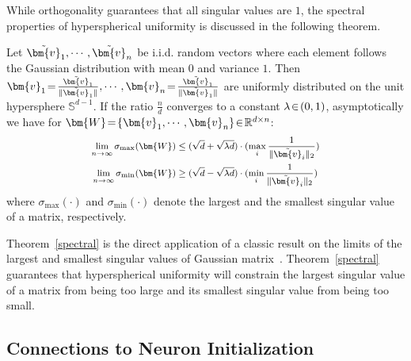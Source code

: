 While orthogonality guarantees that all singular values are $1$, the spectral properties of hyperspherical uniformity is discussed in the following theorem.

\begin{theorem}\label{spectral}
Let $\thickmuskip=2mu \medmuskip=2mu \tilde{\bm{v}}_1,\cdots,\tilde{\bm{v}}_n$ be i.i.d. random vectors where each element follows the Gaussian distribution with mean $0$ and variance $1$. Then $\thickmuskip=2mu \medmuskip=2mu \bm{v}_1=\frac{\tilde{\bm{v}}_1}{\|\tilde{\bm{v}}_1\|},\cdots,\bm{v}_n=\frac{\tilde{\bm{v}}_1}{\|\tilde{\bm{v}}_1\|}$ are uniformly distributed on the unit hypersphere $\mathbb{S}^{d-1}$. If the ratio $\frac{n}{d}$ converges to a constant $\thickmuskip=2mu \medmuskip=2mu \lambda\in(0,1)$, asymptotically we have for $\thickmuskip=2mu \medmuskip=2mu \bm{W}=\{\bm{v}_1,\cdots,\bm{v}_n\}\in\mathbb{R}^{d\times n}$:
\begin{equation}\label{spectral_gap}
\footnotesize
\begin{aligned}
    \lim_{n\rightarrow\infty}\sigma_{\max}(\bm{W})&\leq(\sqrt{d}+\sqrt{\lambda d})\cdot(\max_i\frac{1}{\|\tilde{\bm{v}}_i\|_2})\\
    \lim_{n\rightarrow\infty}\sigma_{\min}(\bm{W})&\geq(\sqrt{d}-\sqrt{\lambda d})\cdot(\min_i\frac{1}{\|\tilde{\bm{v}}_i\|_2})
\end{aligned}
\end{equation}
where $\sigma_{\max}(\cdot)$ and $\sigma_{\min}(\cdot)$ denote the largest and the smallest singular value of a matrix, respectively.
\end{theorem}

Theorem~\ref{spectral} is the direct application of a classic result on the limits of the largest and smallest singular values of Gaussian matrix~\cite{silverstein1985smallest}. Theorem~\ref{spectral} guarantees that hyperspherical uniformity will constrain the largest singular value of a matrix from being too large and its smallest singular value from being too small.

\subsection{Connections to Neuron Initialization}\label{neuron_init}


